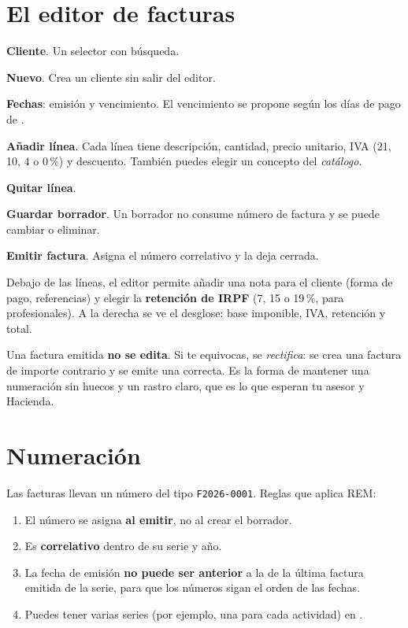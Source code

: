 \section{El editor de facturas}
\begin{leyenda}
\item[\mk{1}] \textbf{Cliente}. Un selector con búsqueda.
\item[\mk{2}] \textbf{Nuevo}. Crea un cliente sin salir del editor.
\item[\mk{3}] \textbf{Fechas}: emisión y vencimiento. El vencimiento se propone según los días de pago de .
\item[\mk{4}] \textbf{Añadir línea}. Cada línea tiene descripción, cantidad, precio unitario, IVA (21, 10, 4 o 0\,\%) y descuento. También puedes elegir un concepto del \emph{catálogo}.
\item[\mk{5}] \textbf{Quitar línea}.
\item[\mk{6}] \textbf{Guardar borrador}. Un borrador no consume número de factura y se puede cambiar o eliminar.
\item[\mk{7}] \textbf{Emitir factura}. Asigna el número correlativo y la deja cerrada.
\end{leyenda}
Debajo de las líneas, el editor permite añadir una nota para el cliente (forma de pago, referencias) y elegir la \textbf{retención de IRPF} (7, 15 o 19\,\%, para profesionales). A la derecha se ve el desglose: base imponible, IVA, retención y total.

\begin{warnbox}
Una factura emitida \textbf{no se edita}. Si te equivocas, se \emph{rectifica}: se crea una factura de importe contrario y se emite una correcta. Es la forma de mantener una numeración sin huecos y un rastro claro, que es lo que esperan tu asesor y Hacienda.
\end{warnbox}

\section{Numeración}
Las facturas llevan un número del tipo \texttt{F2026-0001}. Reglas que aplica REM:
\begin{enumerate}
\item El número se asigna \textbf{al emitir}, no al crear el borrador.
\item Es \textbf{correlativo} dentro de su serie y año.
\item La fecha de emisión \textbf{no puede ser anterior} a la de la última factura emitida de la serie, para que los números sigan el orden de las fechas.
\item Puedes tener varias series (por ejemplo, una para cada actividad) en .
\end{enumerate}

